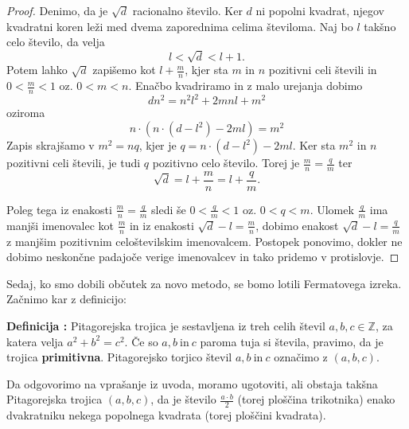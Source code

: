 \documentclass[a4paper, 10pt]{article}
\newcounter{defcount}
\newenvironment{definicija}{\begin{flushleft}\stepcounter{defcount}\textbf{Definicija \arabic{defcount}:}}{\hfill\end{flushleft}}
\newcommand{\mth}[1]{\ensuremath{\mathbb{#1}}}
\newcommand{\Z}{\mth{Z}}
\begin{document}
\begin{proof}
Denimo, da je $\sqrt{d}$ racionalno število. Ker $d$ ni popolni kvadrat, njegov kvadratni koren leži med dvema zaporednima celima številoma. Naj bo $l$ takšno celo število, da velja \[
l < \sqrt{d} < l+1
.\] Potem lahko $\sqrt{d}$ zapišemo kot $l + \frac{m}{n}$, kjer sta $m$ in $n$ pozitivni celi števili in $0 < \frac{m}{n} < 1$ oz. $0 < m < n$. Enačbo kvadriramo in z malo urejanja dobimo
\[
dn^2 =n^2l^2 + 2mnl + m^2
\]
oziroma
\[
n \cdot (n \cdot (d -  l^2) - 2ml) = m^2
\]
Zapis skrajšamo v $m^2 = nq$, kjer je $q = n \cdot (d -  l^2) - 2ml$. Ker sta $m^2$ in $n$ pozitivni celi števili, je tudi $q$ pozitivno celo število. Torej je $\frac{m}{n} = \frac{q}{m}$ ter 
\[
\sqrt{d} = l + \frac{m}{n} =  l + \frac{q}{m}.
\]

Poleg tega iz enakosti $\frac{m}{n} = \frac{q}{m}$ sledi še $0 < \frac{q}{m} < 1$ oz. $0 < q < m$. Ulomek $\frac{q}{m}$ ima manjši imenovalec kot $\frac{m}{n}$ in iz enakosti $\sqrt{d} - l =\frac{m}{n}$, dobimo enakost $\sqrt{d} - l =\frac{q}{m}$ z manjšim pozitivnim celoštevilskim imenovalcem. Postopek ponovimo, dokler ne dobimo neskončne padajoče verige imenovalcev in tako pridemo v protislovje.
\end{proof}

Sedaj, ko smo dobili občutek za novo metodo, se bomo lotili Fermatovega izreka. Začnimo kar z definicijo:

\begin{definicija}
Pitagorejska trojica je sestavljena iz treh celih števil $a, b, c \in \Z$, za katera velja $a^2 + b^2 = c^2$. Če so $a, b~\text{in}~c$ paroma tuja si števila, pravimo, da je trojica \textbf{primitivna}. Pitagorejsko torjico števil $a, b~\text{in}~c$ označimo z $(a, b, c)$.
\end{definicija}

Da odgovorimo na vprašanje iz uvoda, moramo ugotoviti, ali obstaja takšna Pitagorejska trojica $(a, b, c)$, da je število $\frac{a\cdot b}{2}$ (torej ploščina trikotnika) enako dvakratniku nekega popolnega kvadrata (torej ploščini kvadrata).
\end{document}
